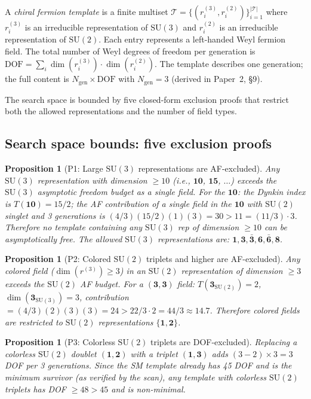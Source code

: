 \documentclass[11pt,a4paper]{article}
\newtheorem{proposition}[theorem]{Proposition}
\theoremstyle{definition}
\newcommand{\SU}{\mathrm{SU}}
\begin{document}
A \emph{chiral fermion template} is a finite multiset
$\mathcal{T} = \{(r_i^{(3)}, r_i^{(2)})\}_{i=1}^{|\mathcal{T}|}$
where $r_i^{(3)}$ is an irreducible representation of $\SU(3)$ and
$r_i^{(2)}$ is an irreducible representation of $\SU(2)$.  Each entry
represents a left-handed Weyl fermion field.  The total number of Weyl
degrees of freedom per generation is
$\mathrm{DOF} = \sum_i \dim(r_i^{(3)}) \cdot \dim(r_i^{(2)})$.
The template describes one generation; the full content is
$N_{\mathrm{gen}} \times \mathrm{DOF}$ with $N_{\mathrm{gen}} = 3$
(derived in Paper~2, \S9).

The search space is bounded by five closed-form exclusion proofs that
restrict both the allowed representations and the number of field types.


\subsection{Search space bounds: five exclusion proofs}
\label{sec:exclusion_proofs}

\begin{proposition}[P1: Large $\SU(3)$ representations are AF-excluded]
\label{prop:P1}
Any $\SU(3)$ representation with dimension $\ge 10$ (i.e.,
$\mathbf{10}$, $\mathbf{15}$, $\ldots$) exceeds the $\SU(3)$
asymptotic freedom budget as a single field.  For the $\mathbf{10}$:
the Dynkin index is $T(\mathbf{10}) = 15/2$; the AF contribution of
a single field in the $\mathbf{10}$ with $\SU(2)$ singlet and 3
generations is $(4/3)(15/2)(1)(3) = 30 > 11 = (11/3) \cdot 3$.
Therefore no template containing any $\SU(3)$ rep of dimension
$\ge 10$ can be asymptotically free.  The allowed $\SU(3)$
representations are: $\mathbf{1}, \mathbf{3}, \bar{\mathbf{3}},
\mathbf{6}, \bar{\mathbf{6}}, \mathbf{8}$.
\end{proposition}

\begin{proposition}[P2: Colored $\SU(2)$ triplets and higher are AF-excluded]
\label{prop:P2}
Any colored field ($\dim(r^{(3)}) \ge 3$) in an $\SU(2)$
representation of dimension $\ge 3$ exceeds the $\SU(2)$ AF budget.
For a $(\mathbf{3}, \mathbf{3})$ field: $T(\mathbf{3}_{\SU(2)}) = 2$,
$\dim(\mathbf{3}_{\SU(3)}) = 3$, contribution $= (4/3)(2)(3)(3) = 24
> 22/3 \cdot 2 = 44/3 \approx 14.7$.  Therefore colored fields are
restricted to $\SU(2)$ representations $\{\mathbf{1}, \mathbf{2}\}$.
\end{proposition}

\begin{proposition}[P3: Colorless $\SU(2)$ triplets are DOF-excluded]
\label{prop:P3}
Replacing a colorless $\SU(2)$ doublet $(\mathbf{1}, \mathbf{2})$ with
a triplet $(\mathbf{1}, \mathbf{3})$ adds $(3-2) \times 3 = 3$ DOF per
3 generations.  Since the SM template already has 45 DOF and is the
minimum survivor (as verified by the scan), any template with colorless
$\SU(2)$ triplets has DOF $\ge 48 > 45$ and is non-minimal.
\end{proposition}
\end{document}
